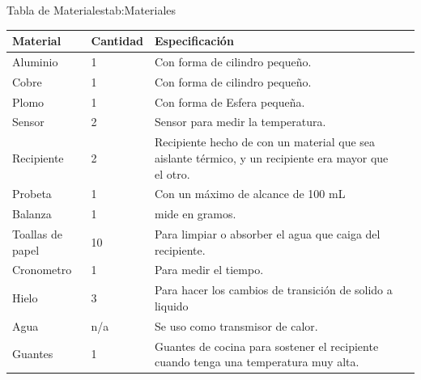 \documentclass[12pt,a4paper]{config/myConfig}
\begin{document}
\begin{TableLab}{Tabla de Materiales}{}{tab:Materiales}
    \begin{tabularx}{\textwidth}{@{} l l >{\hsize}Y  >{\raggedright\arraybackslash}X @{}}
        \toprule
        \textbf{Material} & \textbf{Cantidad} & \textbf{Especificación} \\
        \midrule
        Aluminio & 1 & Con forma de cilindro pequeño. \\
        Cobre & 1 & Con forma de cilindro pequeño. \\
        Plomo & 1 & Con forma de Esfera pequeña. \\
        Sensor & 2 & Sensor para medir la temperatura. \\
        Recipiente & 2 & Recipiente hecho de con un material que sea aislante térmico, y un recipiente era mayor que el otro. \\
        Probeta & 1 & Con un máximo de alcance de 100 mL\\
        Balanza & 1 & mide en gramos.\\
        Toallas de papel & 10 & Para limpiar o absorber el agua que caiga del recipiente.\\
        Cronometro & 1 & Para medir el tiempo.\\
        Hielo & 3 & Para hacer los cambios de transición de solido a liquido\\
        Agua & n/a & Se uso como transmisor de calor.\\
        Guantes & 1 & Guantes de cocina para sostener el recipiente cuando tenga una temperatura muy alta.\\
        \bottomrule
    \end{tabularx}
\end{TableLab}

\end{document}
